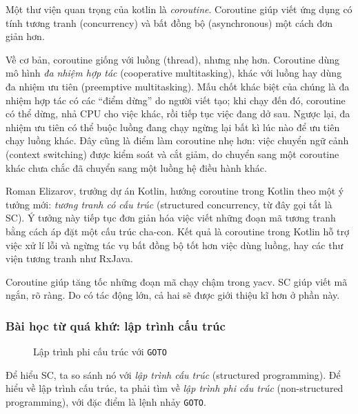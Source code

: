 \documentclass[../../thesis]{subfiles}
\begin{document}
Một thư viện quan trọng của kotlin là \emph{coroutine}. Coroutine giúp viết ứng
dụng có tính tương tranh (concurrency) và bất đồng bộ (asynchronous) một cách
đơn giản hơn.

Về cơ bản, coroutine giống với luồng (thread), nhưng nhẹ hơn. Coroutine dùng mô
hình \emph{đa nhiệm hợp tác} (cooperative multitasking), khác với luồng hay dùng
đa nhiệm ưu tiên (preemptive multitasking). Mấu chốt khác biệt của chúng là đa
nhiệm hợp tác có các ``điểm dừng'' do người viết tạo; khi chạy đến đó, coroutine
có thể dừng, nhả CPU cho việc khác, rồi tiếp tục việc đang dở sau. Ngược lại, đa
nhiệm ưu tiên có thể buộc luồng đang chạy ngừng lại bất kì lúc nào để ưu tiên
chạy luồng khác. Đây cũng là điểm làm coroutine nhẹ hơn: việc chuyển ngữ cảnh
(context switching) được kiểm soát và cắt giảm, do chuyển sang một coroutine
khác chưa chắc đã chuyển sang một luồng hệ điều hành khác.

Roman Elizarov, trưởng dự án Kotlin, hướng coroutine trong Kotlin theo một ý
tưởng mới: \emph{tương tranh có cấu trúc} (structured concurrency, từ đây gọi
tắt là SC). Ý tưởng này tiếp tục đơn giản hóa việc viết những đoạn mã tương
tranh bằng cách áp đặt một cấu trúc cha-con. Kết quả là coroutine trong Kotlin
hỗ trợ việc xử lí lỗi và ngừng tác vụ bất đồng bộ tốt hơn việc dùng luồng, hay
các thư viện tương tranh như RxJava.

Coroutine giúp tăng tốc những đoạn mã chạy chậm trong yacv. SC giúp viết mã
ngắn, rõ ràng. Do có tác động lớn, cả hai sẽ được giới thiệu kĩ hơn ở phần này.

\subsubsection{Bài học từ quá khứ: lập trình cấu trúc}

\begin{figure}
    \centering
    \vspace*{-6mm}
    
    \vspace*{-10mm}    %
    \caption{Lập trình phi cấu trúc với \texttt{GOTO} \cite{NJS_SC}}
    \label{fig:non-structured-programming}
\end{figure}

Để hiểu SC, ta so sánh nó với \emph{lập trình cấu trúc} (structured
programming). Để hiểu về lập trình cấu trúc, ta phải tìm về \emph{lập trình phi
cấu trúc} (non-structured programming), với đặc điểm là lệnh nhảy \texttt{GOTO}.
\end{document}
